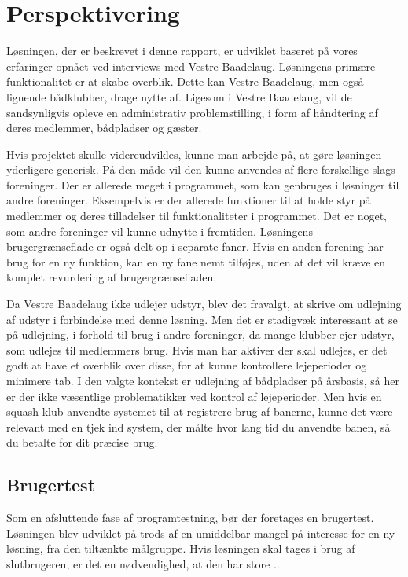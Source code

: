 \chapter{Perspektivering}
\label{cha:perspektivering}

Løsningen, der er beskrevet i denne rapport, er udviklet baseret på vores erfaringer opnået ved interviews med Vestre Baadelaug. Løsningens primære funktionalitet er at skabe overblik. Dette kan Vestre Baadelaug, men også lignende bådklubber, drage nytte af. Ligesom i Vestre Baadelaug, vil de sandsynligvis opleve en administrativ problemstilling, i form af håndtering af deres medlemmer, bådpladser og gæster.

Hvis projektet skulle videreudvikles, kunne man arbejde på, at gøre løsningen yderligere generisk. På den måde vil den kunne anvendes af flere forskellige slags foreninger. Der er allerede meget i programmet, som kan genbruges i løsninger til andre foreninger. Eksempelvis er der allerede funktioner til at holde styr på medlemmer og deres tilladelser til funktionaliteter i programmet. Det er noget, som andre foreninger vil kunne udnytte i fremtiden. Løsningens brugergrænseflade er også delt op i separate faner. Hvis en anden forening har brug for en ny funktion, kan en ny fane nemt tilføjes, uden at det vil kræve en komplet revurdering af brugergrænsefladen.

Da Vestre Baadelaug ikke udlejer udstyr, blev det fravalgt, at skrive om udlejning af udstyr i forbindelse med denne løsning. Men det er stadigvæk interessant at se på udlejning, i forhold til brug i andre foreninger, da mange klubber ejer udstyr, som udlejes til medlemmers brug. Hvis man har aktiver der skal udlejes, er det godt at have et overblik over disse, for at kunne kontrollere lejeperioder og minimere tab. I den valgte kontekst er udlejning af bådpladser på årsbasis, så her er der ikke væsentlige problematikker ved kontrol af lejeperioder. Men hvis en squash-klub anvendte systemet til at registrere brug af banerne, kunne det være relevant med en tjek ind system, der målte hvor lang tid du anvendte banen, så du betalte for dit præcise brug.

\section{Brugertest}

Som en afsluttende fase af programtestning, bør der foretages en brugertest. Løsningen blev udviklet på trods af en umiddelbar mangel på interesse for en ny løsning, fra den tiltænkte målgruppe. Hvis løsningen skal tages i brug af slutbrugeren, er det en nødvendighed, at den har store .. 

